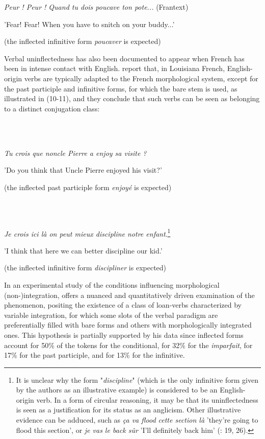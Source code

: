 \documentclass[output=paper]{langscibook}
\begin{document}
          \textit{Peur ! Peur ! Quand tu dois poucave ton pote...} (Frantext)

  {}'Fear! Fear! When you have to snitch on your buddy...'

  (the inflected infinitive form \textit{poucaver} is expected)

Verbal uninflectedness has also been documented to appear when French has been in intense contact with English. \citet{DuboisSankoff1997} report that, in Louisiana French, English-origin verbs are typically adapted to the French morphological system, except for the past participle and infinitive forms, for which the bare stem is used, as illustrated in (10-11), and they conclude that such verbs can be seen as belonging to a distinct conjugation class:

\ea%
    \label{ex:key:10}
    \gll \\
         \\
    \glt
    \z %

          \textit{Tu crois que noncle Pierre a enjoy sa visite ?}

  {}'Do you think that Uncle Pierre enjoyed his visit?'

  (the inflected past participle form \textit{enjoyé} is expected)

\ea%
    \label{ex:key:11}
    \gll \\
         \\
    \glt
    \z %

          \textit{Je crois ici là on peut mieux discipline notre enfant}.\footnote{It is unclear why the form "\textit{discipline}" (which is the only infinitive form given by the authors as an illustrative example) is considered to be an English-origin verb. In a form of circular reasoning, it may be that its uninflectedness is seen as a justification for its status as an anglicism. Other illustrative evidence can be adduced, such as \textit{ça va flood cette section là} 'they're going to flood this section', or \textit{je vas le back sûr} 'I'll definitely back him' (\citealt{Root2018}: 19, 26).}

  {}'I think that here we can better discipline our kid.'

  (the inflected infinitive form \textit{discipliner} is expected)

In an experimental study of the conditions influencing morphological (non-)integration, \citet{Root2018} offers a nuanced and quantitatively driven examination of the phenomenon, positing the existence of a class of loan-verbs characterized by variable integration, for which some slots of the verbal paradigm are preferentially filled with bare forms and others with morphologically integrated ones. This hypothesis is partially supported by his data since inflected forms account for 50\% of the tokens for the conditional, for 32\% for the \textit{imparfait}, for 17\% for the past participle, and for 13\% for the infinitive.
\end{document}
